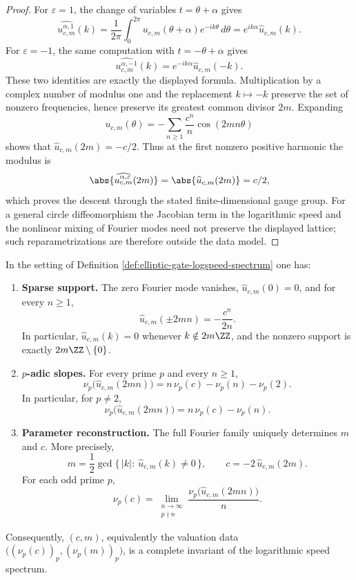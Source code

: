 \begin{proof}
For \(\varepsilon=1\), the change of variables \(t=\theta+\alpha\) gives
\[
\widehat{u^{\alpha,1}_{c,m}}(k)
=\frac1{2\pi}\int_0^{2\pi}u_{c,m}(\theta+\alpha)e^{-ik\theta}\,d\theta
=e^{ik\alpha}\widehat u_{c,m}(k).
\]
For \(\varepsilon=-1\), the same computation with \(t=-\theta+\alpha\) gives
\[
\widehat{u^{\alpha,-1}_{c,m}}(k)=e^{-ik\alpha}\widehat u_{c,m}(-k).
\]
These two identities are exactly the displayed formula.  Multiplication by a complex number of modulus one and the replacement \(k\mapsto-k\) preserve the set of nonzero frequencies, hence preserve its greatest common divisor \(2m\).  Expanding
\[
u_{c,m}(\theta)=-\sum_{n\ge1}\frac{c^n}{n}\cos(2mn\theta)
\]
shows that \(\widehat u_{c,m}(2m)=-c/2\).  Thus at the first nonzero positive harmonic the modulus is
\[
\abs{\widehat{u^{\alpha,\varepsilon}_{c,m}}(2m)}
=\abs{\widehat u_{c,m}(2m)}=c/2,
\]
which proves the descent through the stated finite-dimensional gauge group.  For a general circle diffeomorphism the Jacobian term in the logarithmic speed and the nonlinear mixing of Fourier modes need not preserve the displayed lattice; such reparametrizations are therefore outside the data model.
\end{proof}

\begin{theorem}\label{thm:elliptic-gate-prime-spectrum-rigidity}
In the setting of Definition \ref{def:elliptic-gate-logspeed-spectrum} one has:
\begin{enumerate}
  \item \textbf{Sparse support.}
  The zero Fourier mode vanishes, \(\widehat u_{c,m}(0)=0\), and for every \(n\ge 1\),
  \[
  \widehat u_{c,m}(\pm 2mn)=-\frac{c^n}{2n}.
  \]
  In particular, \(\widehat u_{c,m}(k)=0\) whenever \(k\notin 2m\ZZ\), and the nonzero support is exactly \(2m\ZZ\setminus\{0\}\).

  \item \textbf{\(p\)-adic slopes.}
  For every prime \(p\) and every \(n\ge 1\),
  \[
  \nu_p\!\bigl(\widehat u_{c,m}(2mn)\bigr)
  =n\,\nu_p(c)-\nu_p(n)-\nu_p(2).
  \]
  In particular, for \(p\neq 2\),
  \[
  \nu_p\!\bigl(\widehat u_{c,m}(2mn)\bigr)=n\,\nu_p(c)-\nu_p(n).
  \]

  \item \textbf{Parameter reconstruction.}
  The full Fourier family uniquely determines \(m\) and \(c\). More precisely,
  \[
  m=\frac12\gcd\{\,|k|:\ \widehat u_{c,m}(k)\neq 0\,\},
  \qquad
  c=-2\,\widehat u_{c,m}(2m).
  \]
  For each odd prime \(p\),
  \[
  \nu_p(c)
  =
  \lim_{\substack{n\to\infty\\ p\nmid n}}
  \frac{\nu_p\!\bigl(\widehat u_{c,m}(2mn)\bigr)}{n}.
  \]
\end{enumerate}
Consequently, \((c,m)\), equivalently the valuation data \(\bigl((\nu_p(c))_p,(\nu_p(m))_p\bigr)\), is a complete invariant of the logarithmic speed spectrum.
\end{theorem}

